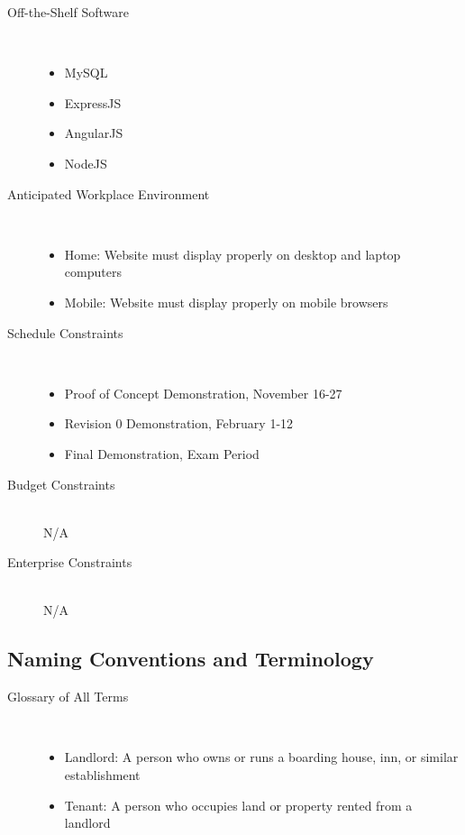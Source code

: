 \documentclass[12pt, titlepage]{article}
\begin{document}
\begin{description}
  \item[Off-the-Shelf Software] \hfill \\
    \begin{itemize}
    \item MySQL
    \item ExpressJS
    \item AngularJS
    \item NodeJS
    \end{itemize}
  \item[Anticipated Workplace Environment] \hfill \\
    \begin{itemize}
    \item Home: Website must display properly on desktop and laptop computers
    \item Mobile: Website must display properly on mobile browsers
    \end{itemize}
  \item[Schedule Constraints] \hfill \\
    \begin{itemize}
    \item Proof of Concept Demonstration, November 16-27
    \item Revision 0 Demonstration, February 1-12
    \item Final Demonstration, Exam Period
    \end{itemize}
  \item[Budget Constraints] \hfill \\
    N/A
  \item[Enterprise Constraints] \hfill \\
    N/A
\end{description}
\subsection{Naming Conventions and Terminology} %
\begin{description}
  \item[Glossary of All Terms] \hfill \\
    \begin{itemize}
    \item Landlord: A person who owns or runs a boarding house, inn, or similar
      establishment
    \item Tenant: A person who occupies land or property rented from a landlord
    \end{itemize}
\end{description}
\end{document}
